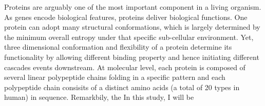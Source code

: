Proteins are arguably one of the most important component in a living organism. As genes encode biological features, proteins deliver biological functions. One protein can adopt many structural conformations, which is largely determined by the minimum overall entropy under that specific sub-cellular environment. Yet, three dimensional conformation and flexibility of a protein determine its functionality by allowing different binding property and hence initiating different cascades events downstream. At molecular level, each protein is composed of several linear polypeptide chains folding in a specific pattern and each polypeptide chain consisits of a distinct amino acids (a total of 20 types in human) in sequence. Remarkbily, the  In this study, I will be 